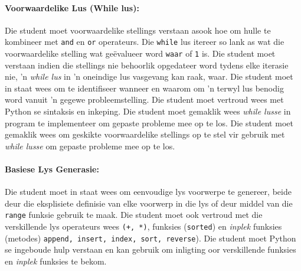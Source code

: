             \paragraph{Voorwaardelike Lus (While lus):}
                Die student moet voorwaardelike stellings verstaan asook hoe om
                hulle te kombineer met \texttt{and} en \texttt{or} operateurs.
                Die \texttt{while} lus itereer so lank as wat die
                voorwaardelike stelling wat ge\"evalueer word \texttt{waar} of
                \texttt{1} is. Die student moet verstaan indien die stellings
                nie behoorlik opgedateer word tydens elke iterasie nie, 'n
                \textit{while lus} in 'n oneindige lus vasgevang kan raak,
                waar. Die student moet in staat wees om te identifiseer wanneer
                en waarom om 'n terwyl lus benodig word vanuit 'n gegewe
                probleemstelling. Die student moet vertroud wees met Python se
                sintaksis en inkeping. Die student moet gemaklik wees
                \textit{while lusse} in program te implementeer om gepaste
                probleme mee op te los. Die student moet gemaklik wees om
                geskikte voorwaardelike stellings op te stel vir gebruik met
                \textit{while lusse} om gepaste probleme mee op te los.

            \paragraph{Basiese Lys Generasie:}
                Die student moet in staat wees om eenvoudige lys voorwerpe te
                genereer, beide deur die eksplisiete definisie van elke
                voorwerp in die lys of deur middel van die \texttt{range}
                funksie gebruik te maak. Die student moet ook vertroud met die
                verskillende lys operateurs wees \texttt{(+, *)}, funksies
                (\texttt{sorted}) en \textit{inplek} funksies (metodes)
                \texttt{append, insert, index, sort, reverse}). Die student
                moet Python se ingeboude hulp verstaan en kan gebruik om
                inligting oor verskillende funksies en \textit{inplek} funksies
                te bekom.

